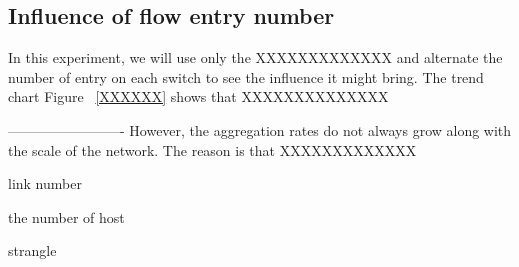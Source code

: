 \subsection{Influence of flow entry number}


In this experiment, we will use only the XXXXXXXXXXXXX and alternate the number of entry on each switch to see the influence it might bring. 
The trend chart Figure ~\ref{XXXXXX} shows that XXXXXXXXXXXXXX

-------------------------
However, the aggregation rates do not always grow along with the scale of the network. The reason is that XXXXXXXXXXXXX


link number

the number of host 

strangle 


 